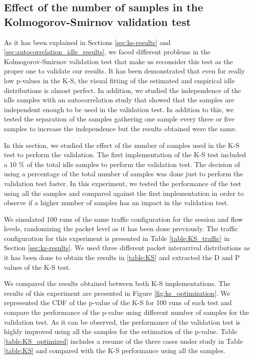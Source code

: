 \subsection{Effect of the number of samples in the Kolmogorov-Smirnov validation test} \label{sec:ks_optimization}
As it has been explained in Sections \ref{sec:ks-results} and \ref{sec:autocorrelation_idle_results}, we faced different problems in the Kolmogorov-Smirnov validation test that make us reconsider this test as the proper one to validate our results. It has been demonstrated that even for really low p-values in the \acs{K-S}, the visual fitting of the estimated and empirical idle distributions is almost perfect. In addition, we studied the independence of the idle samples with an autocorrelation study that showed that the samples are independent enough to be used in the validation test. In addition to this, we tested the separation of the samples gathering one sample every three or five samples to increase the independence but the results obtained were the same.

In this section, we studied the effect of the number of samples used in the \acs{K-S} test to perform the validation. The first implementation of the \acs{K-S} test included a 10 \% of the total idle samples to perform the validation test. The decision of using a percentage of the total number of samples was done just to perform the validation test faster. In this experiment, we tested the performance of the test using all the samples and compared against the first implementation in order to observe if a higher number of samples has an impact in the validation test.

We simulated 100 runs of the same traffic configuration for the session and flow levels, randomizing the packet level as it has been done previously. The traffic configuration for this experiment is presented in Table \ref{table:KS_traffic} in Section \ref{sec:ks-results}. We used three different packet interarrival distributions as it has been done to obtain the results in \ref{table:KS} and extracted the D and P values of the \acs{K-S} test. 

We compared the results obtained between both \acs{K-S} implementations. The results of this experiment are presented in Figure \ref{fig:ks_optimization}. We represented the CDF of the p-value of the \acs{K-S} for 100 runs of each test and compare the performance of the p-value using different number of samples for the validation test. As it can be observed, the performance of the validation test is highly improved using all the samples for the estimation of the p-value. Table \ref{table:KS_optimized} includes a resume of the three cases under study in Table \ref{table:KS} and compared with the \acs{K-S} performance using all the samples.


